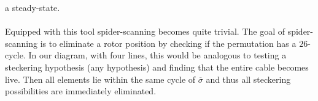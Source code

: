     a steady-state.
    \\\\Equipped with this tool spider-scanning becomes quite trivial. The goal of spider-scanning is to eliminate a rotor position by checking if the permutation has a $26$-cycle. In our diagram, with four lines, 
    this would be analogous to testing a steckering hypothesis (any hypothesis) and finding that the entire cable becomes live. Then all elements lie within the same cycle of $\overline\sigma$ and thus all steckering possibilities are immediately eliminated. 

        
            


